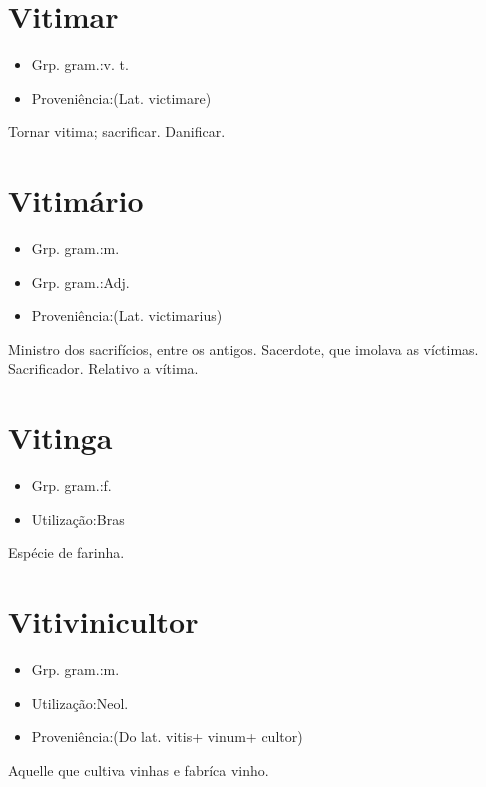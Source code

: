 \documentclass{article}
\begin{document}
\section{Vitimar}
\begin{itemize}
\item {Grp. gram.:v. t.}
\end{itemize}
\begin{itemize}
\item {Proveniência:(Lat. \textunderscore victimare\textunderscore )}
\end{itemize}
Tornar vitima; sacrificar.
Danificar.
\section{Vitimário}
\begin{itemize}
\item {Grp. gram.:m.}
\end{itemize}
\begin{itemize}
\item {Grp. gram.:Adj.}
\end{itemize}
\begin{itemize}
\item {Proveniência:(Lat. \textunderscore victimarius\textunderscore )}
\end{itemize}
Ministro dos sacrifícios, entre os antigos.
Sacerdote, que imolava as víctimas.
Sacrificador.
Relativo a vítima.
\section{Vitinga}
\begin{itemize}
\item {Grp. gram.:f.}
\end{itemize}
\begin{itemize}
\item {Utilização:Bras}
\end{itemize}
Espécie de farinha.
\section{Vitivinicultor}
\begin{itemize}
\item {Grp. gram.:m.}
\end{itemize}
\begin{itemize}
\item {Utilização:Neol.}
\end{itemize}
\begin{itemize}
\item {Proveniência:(Do lat. \textunderscore vitis\textunderscore  + \textunderscore vinum\textunderscore  + \textunderscore cultor\textunderscore )}
\end{itemize}
Aquelle que cultiva vinhas e fabríca vinho.
\end{document}
